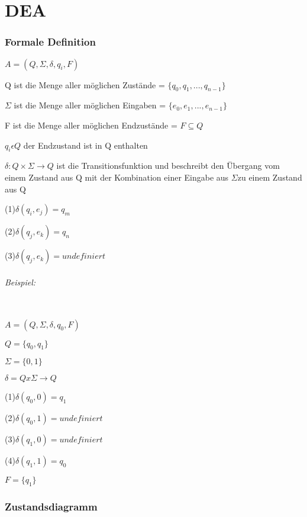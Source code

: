 \part{DEA}

\section{Formale Definition}

$A=(Q,\Sigma,\delta,q_{i},F)$

Q ist die Menge aller möglichen Zustände = $\{q_0,q_1,...,q_{n-1}\}$

$\Sigma$ ist die Menge aller möglichen Eingaben = $\{e_0,e_{1},...,e_{n-1}\}$

F ist die Menge aller möglichen Endzustände = $F\subseteq Q$

$q_{i}\epsilon Q$ der Endzustand ist in Q enthalten

$\delta:Q \times \Sigma \rightarrow Q$ ist die Transitionsfunktion und beschreibt
den Übergang vom einem Zustand aus Q mit der Kombination einer Eingabe
aus $\Sigma$zu einem Zustand aus Q

(1)$\delta(q_{i},e_{j})=q_{m}$

(2)$\delta(q_{j},e_{k})=q_{n}$

(3)$\delta(q_{j},e_{k})=undefiniert$

\paragraph{Beispiel:}\mbox{} \\

$A=(Q,\Sigma,\delta,q_{0},F)$

$Q=\{q_{0},q_{1}\}$

$\Sigma=\{0,1\}$

$\delta=Qx\Sigma\rightarrow Q$

(1)$\delta(q_{0},0)=q_{1}$

(2)$\delta(q_{0},1)=undefiniert$

(3)$\delta(q_{1},0)=undefiniert$

(4)$\delta(q_{1},1)=q_{0}$

$F=\{q_{1}\}$

\section{Zustandsdiagramm}

